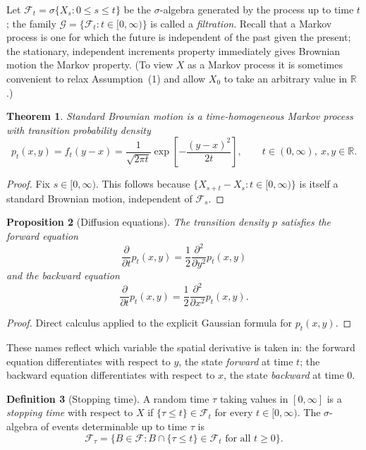 \documentclass[12pt,openany]{book}
\newtheorem{theorem}{Theorem}[section]
\newtheorem{proposition}[theorem]{Proposition}
\theoremstyle{definition}
\newtheorem{definition}[theorem]{Definition}
\theoremstyle{remark}
\newcommand{\R}{\mathbb{R}}
\newcommand{\Fscr}{\mathcal{F}}
\newcommand{\Gscr}{\mathcal{G}}
\begin{document}
Let $\Fscr_t = \sigma\{X_s : 0 \le s \le t\}$ be the $\sigma$-algebra generated by the process up to time $t$; the family $\Gscr = \{\Fscr_t : t \in [0,\infty)\}$ is called a \emph{filtration}. Recall that a Markov process is one for which the future is independent of the past given the present; the stationary, independent increments property immediately gives Brownian motion the Markov property. (To view $X$ as a Markov process it is sometimes convenient to relax Assumption~(1) and allow $X_0$ to take an arbitrary value in $\R$.)
 
\begin{theorem}
Standard Brownian motion is a time-homogeneous Markov process with transition probability density
\begin{equation}
    p_t(x,y) = f_t(y-x) = \frac{1}{\sqrt{2\pi t}} \exp\!\left[-\frac{(y-x)^2}{2t}\right], \qquad t\in(0,\infty),\ x,y\in\R. \tag{18.1.12}
\end{equation}
\end{theorem}
\begin{proof}
Fix $s \in [0,\infty)$. This follows because $\{X_{s+t} - X_s : t \in [0,\infty)\}$ is itself a standard Brownian motion, independent of $\Fscr_s$.
\end{proof}
 
\begin{proposition}[Diffusion equations]
The transition density $p$ satisfies the \emph{forward equation}
\begin{equation}
    \frac{\partial}{\partial t} p_t(x,y) = \frac12 \frac{\partial^2}{\partial y^2} p_t(x,y) \tag{18.1.13}
\end{equation}
and the \emph{backward equation}
\begin{equation}
    \frac{\partial}{\partial t} p_t(x,y) = \frac12 \frac{\partial^2}{\partial x^2} p_t(x,y). \tag{18.1.14}
\end{equation}
\end{proposition}
\begin{proof}
Direct calculus applied to the explicit Gaussian formula for $p_t(x,y)$.
\end{proof}
 
These names reflect which variable the spatial derivative is taken in: the forward equation differentiates with respect to $y$, the state \emph{forward} at time $t$; the backward equation differentiates with respect to $x$, the state \emph{backward} at time $0$.
 
\begin{definition}[Stopping time]
A random time $\tau$ taking values in $[0,\infty]$ is a \emph{stopping time} with respect to $X$ if $\{\tau \le t\} \in \Fscr_t$ for every $t \in [0,\infty)$. The $\sigma$-algebra of events determinable up to time $\tau$ is
\begin{equation}
    \Fscr_\tau = \{ B \in \Fscr : B \cap \{\tau \le t\} \in \Fscr_t \text{ for all } t \ge 0\}. \tag{18.1.15}
\end{equation}
\end{definition}
 
\end{document}
